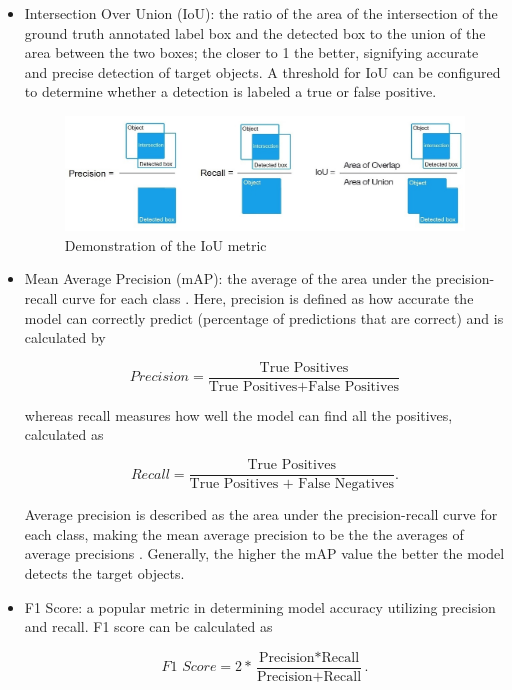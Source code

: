 \documentclass{article}
\begin{document}
            \begin{itemize}
                
                \item Intersection Over Union (IoU): the ratio of the area of the intersection of the ground truth annotated label box and the detected box to the union of the area between the two boxes; the closer to 1 the better, signifying accurate and precise detection of target objects. A threshold for IoU can be configured to determine whether a detection is labeled a true or false positive. 
                
                \begin{figure}[h]
                    \centering
                    \includegraphics[scale=0.5]{iou}
                    \caption{Demonstration of the IoU metric}
                \end{figure}
            
                \item Mean Average Precision (mAP): the average of the area under the precision-recall curve for each class \cite{bochkovskiy2020yolov4, Yohanandan_2020}. Here, precision is defined as how accurate the model can correctly predict (percentage of predictions that are correct) and is calculated by
                
                \[\textit{Precision} = \frac{\text{True Positives}}{\text{True Positives} + \text{False Positives}}\]
                
                whereas recall measures how well the model can find all the positives, calculated as
                
                \[\textit{Recall} = \frac{\text{True Positives}}{\text{True Positives + False Negatives}}.\]
                
                Average precision is described as the area under the precision-recall curve for each class, making the mean average precision to be the the averages of average precisions \cite{Yohanandan_2020}. Generally, the higher the mAP value the better the model detects the target objects.
                
                \item F1 Score: a popular metric in determining model accuracy utilizing precision and recall. F1 score can be calculated as
                
                \[\textit{F1 Score} = 2 * \frac{\text{Precision} * \text{Recall}}{\text{Precision} + \text{Recall}}.\]
                
            \end{itemize}
        
\end{document}
